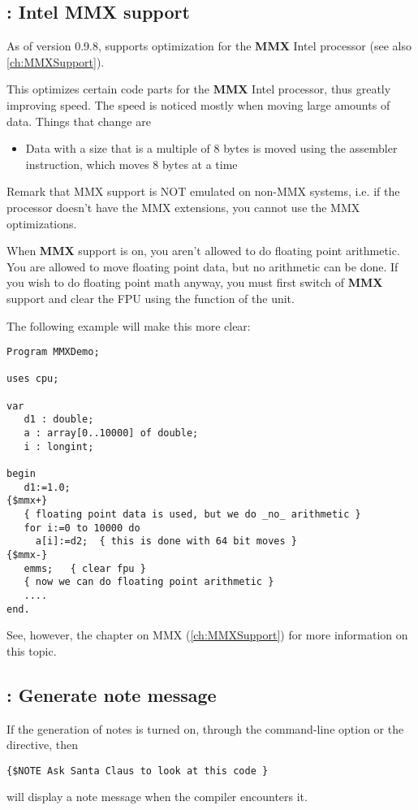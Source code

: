 \documentclass{report}
\begin{document}
 
\subsection{ : Intel MMX support}
As of version 0.9.8, \fpc supports optimization for the \textbf{MMX} Intel
processor (see also \ref{ch:MMXSupport}).

This optimizes certain code parts for the \textbf{MMX} Intel
processor, thus greatly improving speed. The speed is noticed mostly when
moving large amounts of data. Things that change are
\begin{itemize}
\item Data with a size that is a multiple of 8 bytes is moved using the
 assembler instruction, which moves 8 bytes at a time
\end{itemize}
Remark that MMX support is NOT emulated on non-MMX systems, i.e. if
the processor doesn't have the MMX extensions, you cannot use the MMX
optimizations.

When \textbf{MMX} support is on, you aren't allowed to do floating point
arithmetic. You are allowed to move floating point data, but no arithmetic
can be done. If you wish to do floating point math anyway, you must first
switch of \textbf{MMX} support and clear the FPU using the 
function of the  unit.

The following example will make this more clear:
\begin{verbatim}
Program MMXDemo;

uses cpu;

var
   d1 : double;
   a : array[0..10000] of double;
   i : longint;

begin
   d1:=1.0;
{$mmx+}
   { floating point data is used, but we do _no_ arithmetic }
   for i:=0 to 10000 do
     a[i]:=d2;  { this is done with 64 bit moves }
{$mmx-}
   emms;   { clear fpu }
   { now we can do floating point arithmetic }
   ....
end.
\end{verbatim}
See, however, the chapter on MMX (\ref{ch:MMXSupport}) for more information
on this topic.

\subsection{ : Generate note message}

If the generation of notes is turned on, through the  command-line
option or the  directive, then
\begin{verbatim}
{$NOTE Ask Santa Claus to look at this code }
\end{verbatim}
will display a note message when the compiler encounters it.
\end{document}

